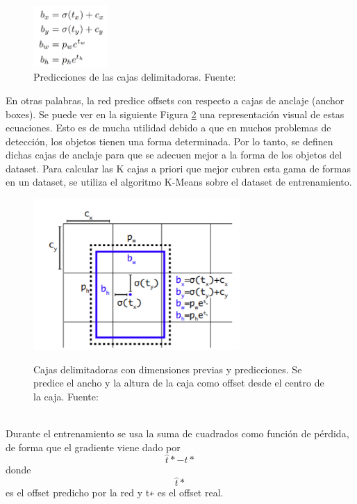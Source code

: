 \begin{figure}[h!]
    \centering
    \includegraphics[width=0.25\textwidth]{img/BoundingBoxesFormula.png}
    \caption{Predicciones de las cajas delimitadoras. Fuente: \cite{yolov3}}
    \label{fig:prediccion de bb}
\end{figure}

\newline
En otras palabras, la red predice offsets con respecto a cajas de anclaje (anchor boxes). Se puede ver en la siguiente Figura \ref{fig:cajas delimitdoras} una representación visual de estas ecuaciones. Esto es de mucha utilidad debido a que en muchos problemas de detección, los objetos tienen una forma determinada. Por lo tanto, se definen dichas cajas de anclaje para que se adecuen mejor a la forma de los objetos del dataset. Para calcular las K cajas a priori que mejor cubren esta gama de formas en un dataset, se utiliza el algoritmo K-Means sobre el dataset de entrenamiento.

\begin{figure}
    \centering
    \includegraphics[width=0.7\textwidth]{img/BoundingBoxes.png}\\
    \caption{Cajas delimitadoras con dimensiones previas y predicciones. Se predice el ancho y la altura de la caja como offset desde el centro de la caja. Fuente: \cite{yolov3}}
    \label{fig:cajas delimitdoras}
\end{figure}
\\
Durante el entrenamiento se usa la suma de cuadrados como función de pérdida, de forma que el gradiente viene dado por \[\hat{t} \ast - t\ast \]  donde \[{\hat{t}\ast}\] es el offset predicho por la red y t∗ es el offset real.

